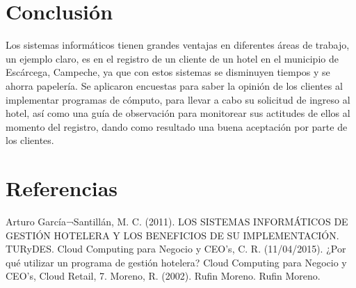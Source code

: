 \documentclass{comjnl}
\begin{document}
\newpage
\section{Conclusión }
Los sistemas informáticos tienen grandes ventajas en diferentes áreas de trabajo, un ejemplo claro, es en el registro de un cliente de un hotel en el municipio de Escárcega, Campeche, ya que con estos sistemas se disminuyen tiempos y se ahorra papelería. 
Se aplicaron encuestas para saber la opinión de los clientes al implementar programas de cómputo, para llevar a cabo su solicitud de ingreso al hotel, así como una guía de observación para monitorear sus actitudes de ellos al momento del registro, dando como resultado una buena aceptación por parte de los clientes.

\nocite{*}
\section{Referencias}


Arturo García¬Santillán, M. C. (2011). LOS SISTEMAS INFORMÁTICOS DE GESTIÓN HOTELERA Y LOS BENEFICIOS DE SU IMPLEMENTACIÓN. TURyDES.
Cloud Computing para Negocio y CEO's, C. R. (11/04/2015). ¿Por qué utilizar un programa de gestión hotelera? Cloud Computing para Negocio y CEO's, Cloud Retail, 7.
Moreno, R. (2002). Rufin Moreno. Rufin Moreno.
\end{document}
